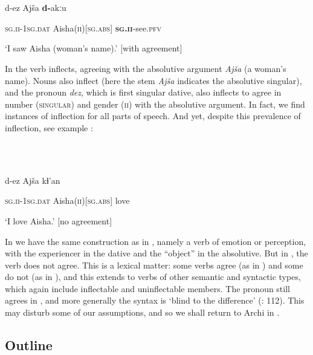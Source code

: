 \documentclass[output=paper]{langscibook}
\begin{document}
\ea%
    \label{ex:key:1}
    \gll \\
         \\
    \glt
    \z %

          d-ez  Ajša  \textbf{d-}akːu



  \textsc{sg.ii}{}-\textsc{1sg.dat}  Aisha(\textsc{ii)[sg.abs]}  \textbf{\textsc{sg.ii}}{}-see.\textsc{pfv}



  ‘I saw Aisha (woman’s name).’    [with agreement]


In  the verb inflects, agreeing with the absolutive argument \textit{Ajša} (a woman’s name). Nouns also inflect (here the stem \textit{Ajša} indicates the absolutive singular), and the pronoun \textit{dez}, which is first singular dative, also inflects to agree in number (\textsc{singular}) and gender (\textsc{ii}) with the absolutive argument. In fact, we find instances of inflection for all parts of speech. And yet, despite this prevalence of inflection, see example : 

\ea%
    \label{ex:key:2}
    \gll \\
         \\
    \glt
    \z %

          d-ez  Ajša  kɬ’an



  \textsc{sg.ii}{}-\textsc{1sg.dat}  Aisha(\textsc{ii})[\textsc{sg.abs}]  love



  ‘I love Aisha.’  [no agreement]


In  we have the same construction as in , namely a verb of emotion or perception, with the experiencer in the dative and the “object” in the absolutive. But in , the verb does not agree. This is a lexical matter: some verbs agree (as in ) and some do not (as in ), and this extends to verbs of other semantic and syntactic types, which again include inflectable and uninflectable members. The pronoun still agrees in , and more generally the syntax is ‘blind to the difference’ (\citealt{ChumakinaBond2016}: 112). This may disturb some of our assumptions, and so we shall return to Archi in .

\subsection{\textbf{Outline}}
\end{document}
